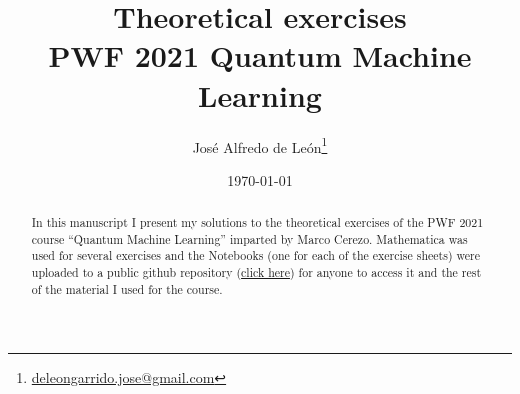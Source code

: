 \documentclass[10pt,a4paper]{article}
\title{\textbf{Theoretical exercises}\\\vspace{2mm}
\large{PWF 2021 Quantum Machine Learning}}
\author[1]{José Alfredo de León\thanks{\href{mailto:deleongarrido.jose@gmail.com}{deleongarrido.jose@gmail.com}}}
\affil[1]{Escuela de Ciencias Físicas y Matemáticas - USAC, Guatemala}
\date{\today}
\newcommand{\1}{\mathbbm{1}}
\begin{document}
\maketitle
\begin{abstract}
In this manuscript I present my solutions to the theoretical exercises of the 
PWF 2021 course ``Quantum Machine Learning'' imparted by Marco Cerezo.
Mathematica was used for several exercises and the Notebooks (one for each
of the exercise sheets) were uploaded to a public github repository 
(\href{https://github.com/deleonja/pwf2021_qml}{click here}) for anyone 
to access it and the rest of the material I used for the course.
\end{abstract}
\tableofcontents




\end{document}
